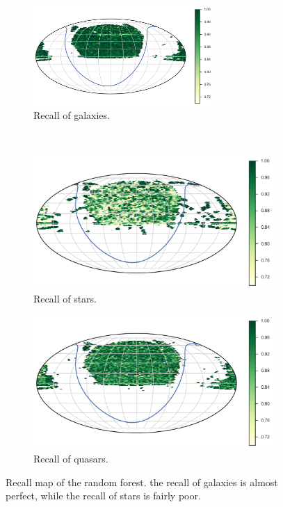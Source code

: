 \begin{figure}[p]
	\centering
	\begin{subfigure}{\textwidth}
		\centering
		\includegraphics[width=0.75\textwidth]{figures/4_expt1/map_recall_forest_all_Galaxy}
		\caption{Recall of galaxies.}
		\label{fig:map_recall_forest_all_Galaxy}
	\end{subfigure}\\
	\begin{subfigure}{\textwidth}
		\centering
		\includegraphics[width=0.75\linewidth]{figures/4_expt1/map_recall_forest_all_Star}
		\caption{Recall of stars.}
		\label{fig:map_recall_forest_all_Star}
	\end{subfigure}
	\begin{subfigure}{\textwidth}
		\centering
		\includegraphics[width=0.75\linewidth]{figures/4_expt1/map_recall_forest_all_Quasar}
		\caption{Recall of quasars.}
		\label{fig:map_recall_forest_all_Quasar}
	\end{subfigure}
	\caption{Recall map of the random forest. the recall of galaxies is almost perfect,
		while the recall of stars is fairly poor.}
	\label{fig:map_recall_forest_all}
\end{figure}



